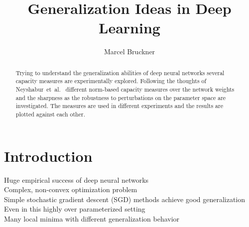 \documentclass[a4paper,10pt]{article}
\title{Generalization Ideas in Deep Learning} %
\author{Marcel Bruckner} %
\institute{\textit{Seminar: Optimization and Generalization in Deep Learning}}
\newcommand{\ns}{Neyshabur~et~al.~\cite{neyshabur2017exploring}}
\begin{document}
\maketitle

\begin{abstract}
Trying to understand the generalization abilities of deep neural networks several capacity measures are experimentally explored. Following the thoughts of \ns{} different norm-based capacity measures over the network weights and the sharpness as the robustness to perturbations on the parameter space are investigated. The measures are used in different experiments and the results are plotted against each other.
\end{abstract}

\section{Introduction}
Huge empirical success of deep neural networks \\
Complex, non-convex optimization problem \\
Simple stochastic gradient descent (SGD) methods achieve good generalization \\
Even in this highly over parameterized setting \\
Many local minima with different generalization behavior 
%




\newpage




\newpage



\newpage

\nocite{*}



\end{document}
